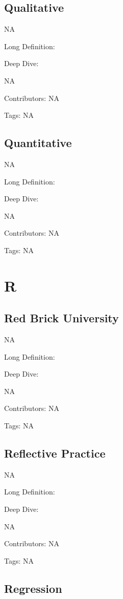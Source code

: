 \documentclass[
  letterpaper,
  DIV=11,
  numbers=noendperiod]{scrreprt}
\begin{document}
\section{Qualitative}\label{qualitative}

NA

Long Definition:

Deep Dive:

NA

Contributors: NA

Tags: NA

\section{Quantitative}\label{quantitative}

NA

Long Definition:

Deep Dive:

NA

Contributors: NA

Tags: NA


\chapter{R}\label{r}

\section{Red Brick University}\label{red-brick-university}

NA

Long Definition:

Deep Dive:

NA

Contributors: NA

Tags: NA

\section{Reflective Practice}\label{reflective-practice}

NA

Long Definition:

Deep Dive:

NA

Contributors: NA

Tags: NA

\section{Regression}\label{regression}
\end{document}
